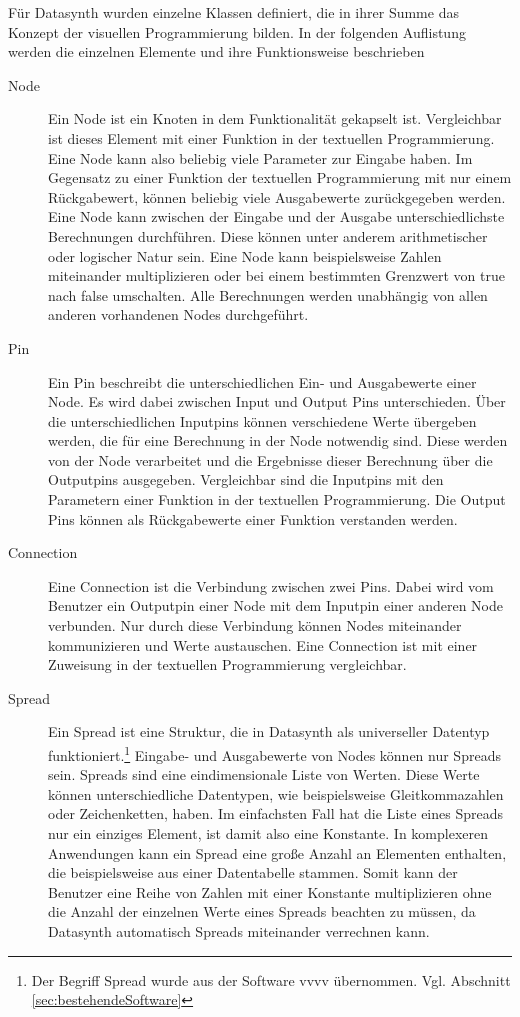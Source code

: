 \documentclass[a4paper, 12pt, DIV=calc, version=first, pdftex, headsepline, footsepline, bibtotocnumbered, liststotocnumbered]{scrreprt}
\begin{document}
Für Datasynth wurden einzelne Klassen definiert, die in ihrer Summe das Konzept der visuellen
Programmierung bilden. In der folgenden Auflistung werden die einzelnen
Elemente und ihre Funktionsweise beschrieben
\begin{description}
\item[Node]
Ein Node ist ein Knoten in dem Funktionalität gekapselt ist. Vergleichbar ist dieses
Element mit einer Funktion in der textuellen Programmierung. Eine Node kann also
beliebig viele Parameter zur Eingabe haben. Im Gegensatz zu einer Funktion der textuellen
Programmierung mit nur einem Rückgabewert, können beliebig viele Ausgabewerte zurückgegeben werden.
Eine Node kann zwischen der Eingabe und der Ausgabe unterschiedlichste Berechnungen durchführen.
Diese können unter anderem arithmetischer oder logischer Natur sein. Eine Node kann beispielsweise
Zahlen miteinander multiplizieren oder bei einem bestimmten Grenzwert von true nach false
umschalten.
Alle Berechnungen werden unabhängig von allen anderen vorhandenen Nodes durchgeführt.
\item[Pin]
Ein Pin beschreibt die unterschiedlichen Ein- und Ausgabewerte einer Node.
Es wird dabei zwischen Input und Output Pins unterschieden. Über die unterschiedlichen
Inputpins können verschiedene Werte übergeben werden, die für eine Berechnung in der Node notwendig sind.
Diese werden von der Node verarbeitet und die Ergebnisse dieser Berechnung
über die Outputpins ausgegeben.
Vergleichbar sind die Inputpins mit den Parametern einer Funktion in der textuellen Programmierung.
Die Output Pins können als Rückgabewerte einer Funktion verstanden werden.
\item[Connection]
Eine Connection ist die Verbindung zwischen zwei Pins. Dabei wird vom Benutzer ein Outputpin einer
Node mit dem Inputpin einer anderen Node verbunden. Nur durch diese Verbindung können
Nodes miteinander kommunizieren und Werte austauschen. Eine Connection
ist mit einer Zuweisung in der textuellen Programmierung vergleichbar.
\item[Spread]
Ein Spread ist eine Struktur, die in Datasynth als universeller Datentyp funktioniert.\footnote{Der
Begriff Spread wurde aus der Software vvvv übernommen. Vgl. Abschnitt \ref{sec:bestehendeSoftware}}
Eingabe- und Ausgabewerte von Nodes können nur Spreads sein. Spreads sind eine 
eindimensionale Liste von Werten. Diese Werte können unterschiedliche Datentypen,
wie beispielsweise Gleitkommazahlen oder Zeichenketten, haben. Im einfachsten Fall hat
die Liste eines Spreads nur ein einziges Element, ist damit also eine Konstante. In komplexeren
Anwendungen kann ein Spread eine große Anzahl an Elementen enthalten, die beispielsweise
aus einer Datentabelle stammen. Somit kann der Benutzer eine Reihe von Zahlen mit
einer Konstante multiplizieren ohne die Anzahl der einzelnen Werte eines Spreads
beachten zu müssen, da Datasynth automatisch Spreads miteinander verrechnen kann.
\end{description}
\end{document}
